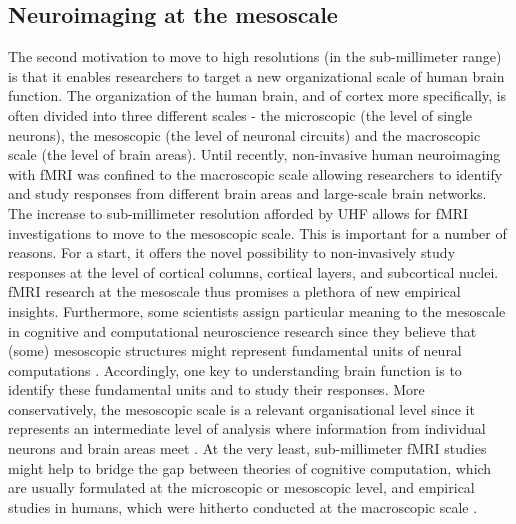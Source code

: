 \subsection{Neuroimaging at the mesoscale}
The second motivation to move to high resolutions (in the sub-millimeter range) is that it enables researchers to target a new organizational scale of human brain function. The organization of the human brain, and of cortex more specifically, is often divided into three different scales - the microscopic (the level of single neurons), the mesoscopic (the level of neuronal circuits) and the macroscopic scale (the level of brain areas). Until recently, non-invasive human neuroimaging with fMRI was confined to the macroscopic scale allowing researchers to identify and study responses from different brain areas and large-scale brain networks. The increase to sub-millimeter resolution afforded by UHF allows for fMRI investigations to move to the mesoscopic scale. This is important for a number of reasons. For a start, it offers the novel possibility to non-invasively study responses at the level of cortical columns, cortical layers, and subcortical nuclei. fMRI research at the mesoscale thus promises a plethora of new empirical insights. Furthermore, some scientists assign particular meaning to the mesoscale in cognitive and computational neuroscience research since they believe that (some) mesoscopic structures might represent fundamental units of neural computations \parencite{Hubel1974, Dumoulin2017}. Accordingly, one key to understanding brain function is to identify these fundamental units and to study their responses. More conservatively, the mesoscopic scale is a relevant organisational level since it represents an intermediate level of analysis where information from individual neurons and brain areas meet \parencite{Mitra2014, DeMartino2016}. At the very least, sub-millimeter fMRI studies might help to bridge the gap between theories of cognitive computation, which are usually formulated at the microscopic or mesoscopic level, and empirical studies in humans, which were hitherto conducted at the macroscopic scale \parencite{MarquardtPhDThesis}.

